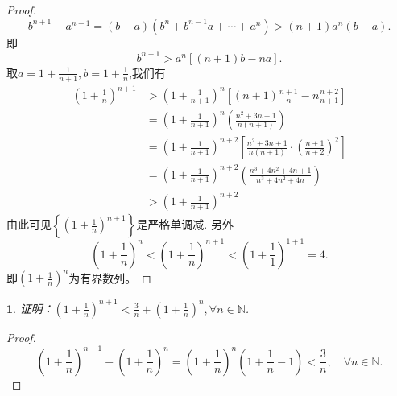 \documentclass[utf8]{book}
\newtheorem{example}{}[section]             %
\begin{document}
\begin{proof}
$$b^{n+1}-a^{n+1}=(b-a)(b^{n}+b^{n-1}a+\cdots+a^n) > (n+1)a^n(b-a).$$
即$$b^{n+1}> a^n\left[(n+1)b-na\right].$$
取$a=1+\displaystyle\frac{1}{n+1}, b = 1+\displaystyle\frac{1}{n}$,我们有
\begin{equation*}
\begin{split}
\left(1+\frac{1}{n}\right)^{n+1} &> \left(1+\frac{1}{n+1}\right)^n\left[(n+1)\frac{n+1}{n}-n\frac{n+2}{n+1}\right]\\
&=\left(1+\frac{1}{n+1}\right)^n\left(\frac{n^2+3n+1}{n(n+1)}\right)\\
&=\left(1+\frac{1}{n+1}\right)^{n+2}\left[\frac{n^2+3n+1}{n(n+1)}\cdot\left(\frac{n+1}{n+2}\right)^2\right]\\
&=\left(1+\frac{1}{n+1}\right)^{n+2}\left(\frac{n^3+4n^2+4n+1}{n^3+4n^2+4n}\right)\\
&>\left(1+\frac{1}{n+1}\right)^{n+2}
\end{split}
\end{equation*}
由此可见$\left\{\left(1+\frac{1}{n}\right)^{n+1}\right\}$是严格单调减.
另外
$$\left(1+\frac{1}{n}\right)^{n}< \left(1+\frac{1}{n}\right)^{n+1}<\left(1+\frac{1}{1}\right)^{1+1}=4.$$
即$\left(1+\frac{1}{n}\right)^{n}$为有界数列。
\end{proof}
\begin{example}
证明：$\left(1+\frac{1}{n}\right)^{n+1} < \frac{3}{n}+\left(1+\frac{1}{n}\right)^n, \forall n\in\mathbb{N}$.
\end{example}
\begin{proof}
$$\left(1+\frac{1}{n}\right)^{n+1} - \left(1+\frac{1}{n}\right)^n = \left(1+\frac{1}{n}\right)^n\left(1+\frac{1}{n} - 1\right)<\frac{3}{n}, \quad\forall n\in\mathbb{N}.$$
\end{proof}
\end{document}
